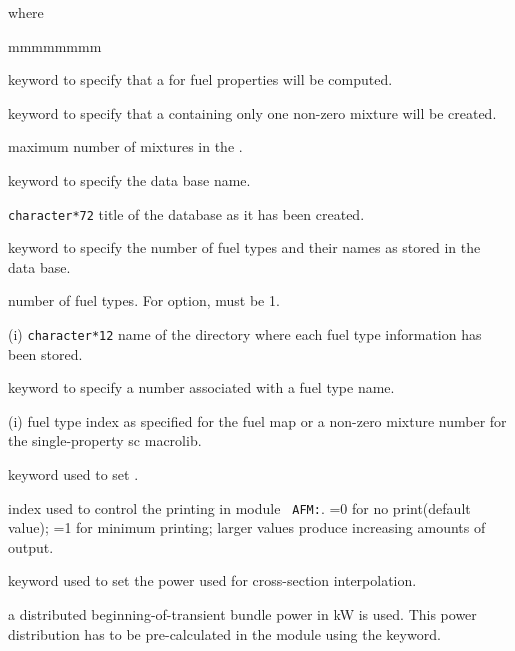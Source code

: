 \noindent where
\begin{ListeDeDescription}{mmmmmmmm}

\item[\moc{MAP}] keyword to specify that a  for fuel properties
will be computed.

\item[\moc{MCR}] keyword to specify that a  containing only
one non-zero mixture will be created.

\item[\dusa{mmix}] maximum number of mixtures in the .

\item[\moc{INFOR}] keyword to specify the data base name.

\item[\dusa{NAMDB}] \texttt{character*72} title of the database as it has been
created.

\item[\moc{DNAME}] keyword to specify the number of fuel types and their
names as stored in the data base.

\item[\dusa{ntyp}] number of fuel types. For  option, 
must be 1.

\item[\dusa{NAMTYP}(i)] \texttt{character*12} name of the directory where each
fuel type information has been stored.
\item[\moc{REFT}] keyword to specify a number associated with
a fuel type name.

\item[\dusa{imix}(i)] fuel type index as specified for the fuel map or a
non-zero mixture number for the single-property {sc macrolib}.

\item[\moc{EDIT}] keyword used to set .

\item[\dusa{iprint}] index used to control the printing in module {\tt
AFM:}. =0 for no print(default value); =1 for minimum printing; 
larger values produce increasing amounts of output.

\item[\moc{FIXP}] keyword used to set the power used for cross-section interpolation.

\item[\moc{INIT}] a distributed beginning-of-transient bundle power in kW is used. This power distribution has to be pre-calculated 
in the  module using the  keyword.


\end{ListeDeDescription}
